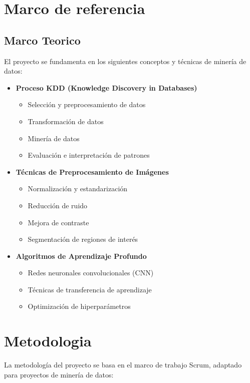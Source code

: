 \documentclass[conference]{IEEEtran}
\begin{document}
\section{Marco de referencia}
\subsection{Marco Teorico}
El proyecto se fundamenta en los siguientes conceptos y técnicas de minería de datos:

\begin{itemize}
    \item \textbf{Proceso KDD (Knowledge Discovery in Databases)}
    \begin{itemize}
        \item Selección y preprocesamiento de datos
        \item Transformación de datos
        \item Minería de datos
        \item Evaluación e interpretación de patrones
    \end{itemize}
    
    \item \textbf{Técnicas de Preprocesamiento de Imágenes}
    \begin{itemize}
        \item Normalización y estandarización
        \item Reducción de ruido
        \item Mejora de contraste
        \item Segmentación de regiones de interés
    \end{itemize}
    
    \item \textbf{Algoritmos de Aprendizaje Profundo}
    \begin{itemize}
        \item Redes neuronales convolucionales (CNN)
        \item Técnicas de transferencia de aprendizaje
        \item Optimización de hiperparámetros
    \end{itemize}
\end{itemize}

\section{Metodologia}
La metodología del proyecto se basa en el marco de trabajo Scrum, adaptado para proyectos de minería de datos:
\end{document}
